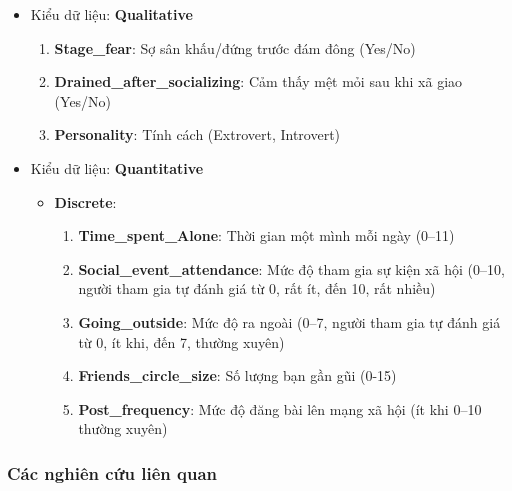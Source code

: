     \begin{itemize}
        \item Kiểu dữ liệu: \textbf{Qualitative} 

        \begin{enumerate}
            \item \textbf{Stage\_fear}: Sợ sân khấu/đứng trước đám đông (Yes/No)

            \item \textbf{Drained\_after\_socializing}: Cảm thấy mệt mỏi sau khi xã giao (Yes/No)

            \item \textbf{Personality}: Tính cách (Extrovert, Introvert)
            
        \end{enumerate}

        \item Kiểu dữ liệu: \textbf{Quantitative} 
        \begin{itemize}
            \item \textbf{Discrete}:

                \begin{enumerate}[resume]
                    \item \textbf{Time\_spent\_Alone}: Thời gian một mình mỗi ngày (0–11)

                    \item \textbf{Social\_event\_attendance}: Mức độ tham gia sự kiện xã hội (0–10, người tham gia tự đánh giá từ 0, rất ít, đến 10, rất nhiều)

                    \item \textbf{Going\_outside}: Mức độ ra ngoài (0–7, người tham gia tự đánh giá từ 0, ít khi, đến 7, thường xuyên)

                    \item \textbf{Friends\_circle\_size}: Số lượng bạn gần gũi (0-15)

                    \item \textbf{Post\_frequency}: Mức độ đăng bài lên mạng xã hội (ít khi 0–10 thường xuyên)

                \end{enumerate}
        \end{itemize}
     
     \end{itemize}

\subsubsection{Các nghiên cứu liên quan}

